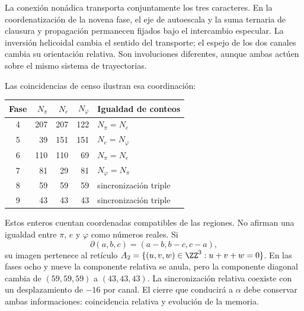 La conexión nonádica transporta conjuntamente los tres caracteres. En la coordenatización de la novena fase, el eje de autoescala y la suma ternaria de clausura y propagación permanecen fijados bajo el intercambio especular. La inversión helicoidal cambia el sentido del transporte; el espejo de los dos canales cambia su orientación relativa. Son involuciones diferentes, aunque ambas actúen sobre el mismo sistema de trayectorias.

Las coincidencias de censo ilustran esa coordinación:
\begin{center}
\begin{tabular}{@{}c rrr l@{}}\toprule
Fase&\(N_\pi\)&\(N_e\)&\(N_\varphi\)&Igualdad de conteos\\\midrule
4&207&207&122&\(N_\pi=N_e\)\\
5&39&151&151&\(N_e=N_\varphi\)\\
6&110&110&69&\(N_\pi=N_e\)\\
7&81&29&81&\(N_\varphi=N_\pi\)\\
8&59&59&59&sincronización triple\\
9&43&43&43&sincronización triple\\\bottomrule
\end{tabular}
\end{center}
Estos enteros cuentan coordenadas compatibles de las regiones. No afirman una igualdad entre \(\pi\), \(e\) y \(\varphi\) como números reales. Si
\[
 \partial(a,b,c)=(a-b,b-c,c-a),
\]
su imagen pertenece al retículo \(A_2=\{(u,v,w)\in\ZZ^3:u+v+w=0\}\). En las fases ocho y nueve la componente relativa se anula, pero la componente diagonal cambia de \((59,59,59)\) a \((43,43,43)\). La sincronización relativa coexiste con un desplazamiento de \(-16\) por canal. El cierre que conducirá a \(\alpha\) debe conservar ambas informaciones: coincidencia relativa y evolución de la memoria.

